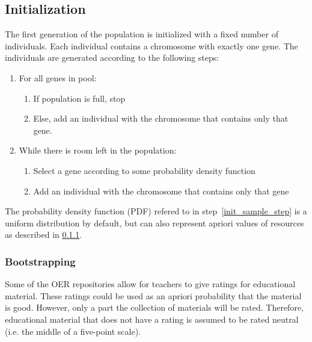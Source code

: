 \subsection{Initialization}
The first generation of the population is initialized with a fixed number of
individuals. Each individual contains a chromosome with exactly one gene. The
individuals are generated according to the following steps:
\begin{enumerate}
	\item For all genes in pool:
		\begin{enumerate}
			\item If population is full, stop
			\item Else, add an individual with the chromosome that contains only that gene.
		\end{enumerate}
	\item While there is room left in the population:
		\begin{enumerate}
			\item \label{init_sample_step}Select a gene according to some probability density function
			\item Add an individual with the chromosome that contains only that
				gene
		\end{enumerate}
\end{enumerate}
The probability density function (PDF) refered to in
step~\ref{init_sample_step} is a uniform distribution by default, but can also
represent apriori values of resources as described in
\ref{sec:approach_bootstrapping}.
\subsubsection{Bootstrapping}
\label{sec:approach_bootstrapping}
Some of the OER repositories allow for teachers to give ratings for educational
material. These ratings could be used as an apriori probability that the
material is good. However, only a part the collection of materials will be
rated. Therefore, educational material that does not have a rating is assumed
to be rated neutral (i.e. the middle of a five-point scale).

